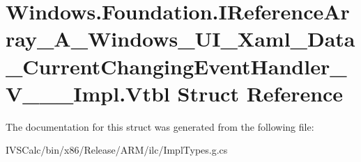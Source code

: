\hypertarget{struct_windows_1_1_foundation_1_1_i_reference_array___a___windows___u_i___xaml___data___current_05b501006979781d3a6e553b2ed01a11}{}\section{Windows.\+Foundation.\+I\+Reference\+Array\+\_\+\+A\+\_\+\+Windows\+\_\+\+U\+I\+\_\+\+Xaml\+\_\+\+Data\+\_\+\+Current\+Changing\+Event\+Handler\+\_\+\+V\+\_\+\+\_\+\+\_\+\+Impl.\+Vtbl Struct Reference}
\label{struct_windows_1_1_foundation_1_1_i_reference_array___a___windows___u_i___xaml___data___current_05b501006979781d3a6e553b2ed01a11}


The documentation for this struct was generated from the following file\+:\begin{DoxyCompactItemize}
\item 
I\+V\+S\+Calc/bin/x86/\+Release/\+A\+R\+M/ilc/Impl\+Types.\+g.\+cs\end{DoxyCompactItemize}
